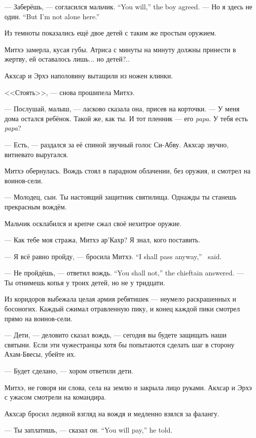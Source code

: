 {--- Заберёшь, --- согласился мальчик.}
{``You will,'' the boy agreed.}
{--- Но я здесь не один.}
{``But I'm not alone here.''}

Из темноты показались ещё двое детей с таким же простым оружием.

Митхэ замерла, кусая губы. Атриса с минуты на минуту должны принести в жертву, ей оставалось лишь... но детей?..

Акхсар и Эрхэ наполовину вытащили из ножен клинки.

<<Стоять>>, --- снова прошипела Митхэ.

--- Послушай, малыш, --- ласково сказала она, присев на корточки.
--- У меня дома остался ребёнок.
Такой же, как ты. И тот пленник --- его \textit{papa}. У тебя есть \textit{papa}?

--- Есть, --- раздался за её спиной звучный голос Си-Абву.
Акхсар звучно, витиевато выругался.

Митхэ обернулась.
Вождь стоял в парадном облачении, без оружия, и смотрел на воинов-сели.

--- Молодец, сын.
Ты настоящий защитник святилища.
Однажды ты станешь прекрасным вождём.

Мальчик осклабился и крепче сжал своё нехитрое оружие.

--- Как тебе моя стража, Митхэ ар’Кахр?
Я знал, кого поставить.

{--- Я всё равно пройду, --- бросила Митхэ.}
{``I shall pass anyway,'' \Mitchoe\ said.}

{--- Не пройдёшь, --- ответил вождь.}
{``You shall not,'' the chieftain answered.}
--- Ты отнимешь копья у троих детей, но не у тридцати.

Из коридоров выбежала целая армия ребятишек --- неумело раскрашенных и босоногих.
Каждый сжимал отравленную пику, и конец каждой пики смотрел прямо на воинов-сели.

--- Дети, --- деловито сказал вождь, --- сегодня вы будете защищать наши святыни.
Если эти чужестранцы хотя бы попытаются сделать шаг в сторону Ахам-Бвесы, убейте их.

--- Будет сделано, --- хором ответили дети.

Митхэ, не говоря ни слова, села на землю и закрыла лицо руками.
Акхсар и Эрхэ с ужасом смотрели на командира.

Акхсар бросил ледяной взгляд на вождя и медленно взялся за фалангу.

{--- Ты заплатишь, --- сказал он.}
{``You will pay,'' he told.}

